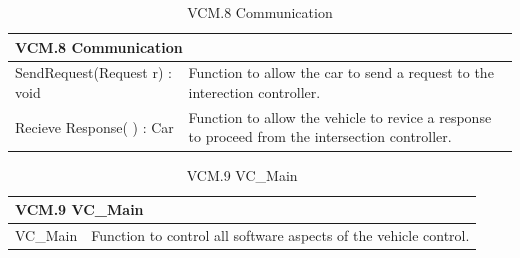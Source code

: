 \documentclass [10pt]{article}
\begin{document}
\begin{longtable}{| p{ } | p{ } | }\caption{VCM.8 Communication} \\\hline  
 \multicolumn{2}{|l|}{\textbf {VCM.8 Communication}}\\ \hline
\cellcolor{tableCell}SendRequest(Request r) : void & \cellcolor{tableCell}Function to allow the car to send a request to the interection controller. \\ \hline 

Recieve Response( ) : Car &Function to allow the vehicle to revice a response to proceed from the intersection controller. \\ \hline 

\end{longtable}

\begin{longtable}{| p{ } | p{ } | }\caption{VCM.9 VC\_Main} \\\hline  
 \multicolumn{2}{|l|}{\textbf {VCM.9 VC\_Main}}\\ \hline
\cellcolor{tableCell}VC\_Main& \cellcolor{tableCell}Function to control all software aspects of the vehicle control.  \\ \hline 

\end{longtable}












\end{document}
